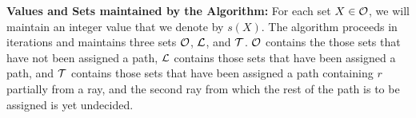 \documentclass[envcountsect, envcountsame, 11pt]{../lib/llncs2e/llncs}
\def\cL{{\cal L}}
\def\cO{{\cal O}}
\def\cT{{\cal T}}
\def\cl{\mathpzc{l}}
\newcommand{\seq}[1]{\left\langle #1 \right\rangle}
\newcommand{\set}[1]{\left\{ #1\right\}}
\begin{document}
\noindent
{\bf Values and Sets maintained by the Algorithm:}
For each set $X \in \cO$, we will maintain an integer value that we denote by $s(X)$.  
 The algorithm proceeds in iterations and maintains three sets $\cO$, $\cL$, and $\cT$.  $\cO$ contains the
 those sets that have not been assigned a path, $\cL$ contains those sets that have been assigned a path, and $\cT$ contains those sets
 that have been assigned a path containing $r$ partially from a ray, and the second ray from which the rest of the path is to be assigned is yet 
 undecided.
\end{document}
